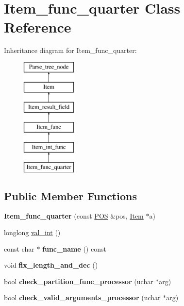\hypertarget{classItem__func__quarter}{}\section{Item\+\_\+func\+\_\+quarter Class Reference}
\label{classItem__func__quarter}
Inheritance diagram for Item\+\_\+func\+\_\+quarter\+:\begin{figure}[H]
\begin{center}
\leavevmode
\includegraphics[height=6.000000cm]{classItem__func__quarter}
\end{center}
\end{figure}
\subsection*{Public Member Functions}
\begin{DoxyCompactItemize}
\item 
\mbox{\label{classItem__func__quarter_abedd552c5b567327ba1d2cb482154040}} 
{\bfseries Item\+\_\+func\+\_\+quarter} (const \mbox{\hyperlink{structYYLTYPE}{P\+OS}} \&pos, \mbox{\hyperlink{classItem}{Item}} $\ast$a)
\item 
longlong \mbox{\hyperlink{classItem__func__quarter_a038ee4437fd15cecd87806fac44be81b}{val\+\_\+int}} ()
\item 
\mbox{\label{classItem__func__quarter_a1d9e3b621782f3e7b3418cb3ff207dd8}} 
const char $\ast$ {\bfseries func\+\_\+name} () const
\item 
\mbox{\label{classItem__func__quarter_a54c46506065d0cff7392c7a73656df39}} 
void {\bfseries fix\+\_\+length\+\_\+and\+\_\+dec} ()
\item 
\mbox{\label{classItem__func__quarter_aec8454aae76e26c85ca7217a7e751413}} 
bool {\bfseries check\+\_\+partition\+\_\+func\+\_\+processor} (uchar $\ast$arg)
\item 
\mbox{\label{classItem__func__quarter_a20207996f1a655734d6f056af12bff0b}} 
bool {\bfseries check\+\_\+valid\+\_\+arguments\+\_\+processor} (uchar $\ast$arg)
\end{DoxyCompactItemize}

